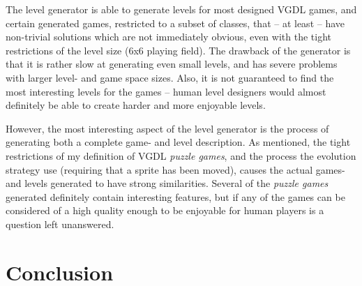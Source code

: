 \documentclass[a4paper,titlepage,final]{report}
\begin{document}
The level generator is able to generate levels for most designed VGDL games, and certain generated games, restricted to a subset of classes, that -- at least -- have non-trivial solutions which are not immediately obvious, even with the tight restrictions of the level size (6x6 playing field).
The drawback of the generator is that it is rather slow at generating even small levels, and has severe problems with larger level- and game space sizes.
Also, it is not guaranteed to find the most interesting levels for the games -- human level designers would almost definitely be able to create harder and more enjoyable levels.

However, the most interesting aspect of the level generator is the process of generating both a complete game- and level description.
As mentioned, the tight restrictions of my definition of VGDL \textit{puzzle games}, and the process the evolution strategy use (requiring that a sprite has been moved), causes the actual games- and levels generated to have strong similarities.
Several of the \textit{puzzle games} generated definitely contain interesting features, but if any of the games can be considered of a high quality enough to be enjoyable for human players is a question left unanswered.






\chapter{Conclusion}
\end{document}
